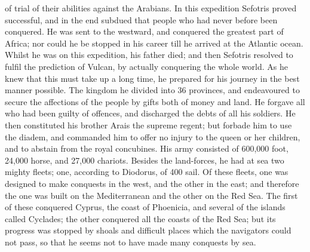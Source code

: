 \documentclass{article}
\begin{document}
of trial of their abilities against the Arabians. In this expedition Sefotris proved successful, and in the end subdued that people who had never before been conquered. He was sent to the westward, and conquered the greatest part of Africa; nor could he be stopped in his career till he arrived at the Atlantic ocean. Whilst he was on this expedition, his father died; and then Sefotris resolved to fulfil the prediction of Vulcan, by actually conquering the whole world. As he knew that this must take up a long time, he prepared for his journey in the best manner possible. The kingdom he divided into 36 provinces, and endeavoured to secure the affections of the people by gifts both of money and land. He forgave all who had been guilty of offences, and discharged the debts of all his soldiers. He then constituted his brother Arais the supreme regent; but forbade him to use the diadem, and commanded him to offer no injury to the queen or her children, and to abstain from the royal concubines. His army consisted of 600,000 foot, 24,000 horse, and 27,000 chariots. Besides the land-forces, he had at sea two mighty fleets; one, according to Diodorus, of 400 sail. Of these fleets, one was designed to make conquests in the west, and the other in the east; and therefore the one was built on the Mediterranean and the other on the Red Sea. The first of these conquered Cyprus, the coast of Phoenicia, and several of the islands called Cyclades; the other conquered all the coasts of the Red Sea; but its progress was stopped by shoals and difficult places which the navigators could not pass, so that he seems not to have made many conquests by sea.
\end{document}
